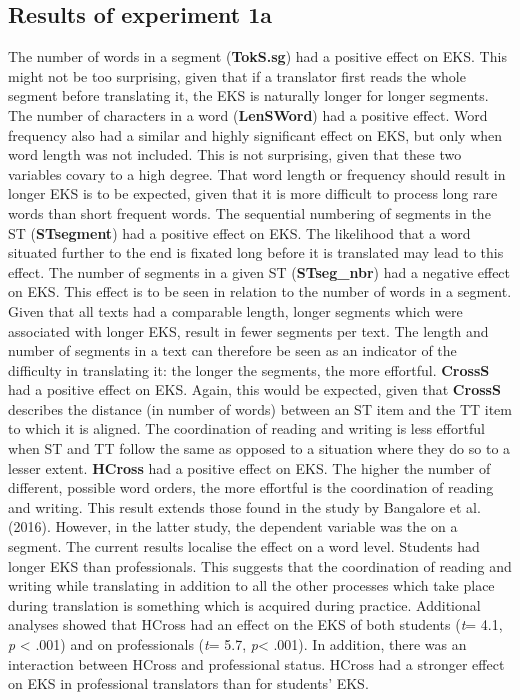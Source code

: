 \documentclass[output=paper]{LSP/langsci}
\begin{document}
\subsection{Results of experiment 1a}

The number of words in a segment (\textbf{TokS.sg}) had a positive effect on EKS. This might not be too surprising, given that if a translator first reads the whole segment before translating it, the EKS is naturally longer for longer segments. The number of characters in a word (\textbf{LenSWord}) had a positive effect. Word frequency also had a similar and highly significant effect on EKS, but only when word length was not included. This is not surprising, given that these two variables covary to a high degree. That word length or frequency should result in longer EKS is to be expected, given that it is more difficult to process long rare words than short frequent words. The sequential numbering of segments in the ST (\textbf{STsegment}) had a positive effect on EKS. The likelihood that a word situated further to the end is fixated long before it is translated may lead to this effect. The number of segments in a given ST (\textbf{STseg\_nbr}) had a negative effect on EKS. This effect is to be seen in relation to the number of words in a segment. Given that all texts had a comparable length, longer segments which were associated with longer EKS, result in fewer segments per text. The length and number of segments in a text can therefore be seen as an indicator of the difficulty in translating it: the longer the segments, the more effortful. \textbf{CrossS} had a positive effect on EKS. Again, this would be expected, given that \textbf{CrossS} describes the distance (in number of words) between an ST item and the TT item to which it is aligned. The coordination of reading and writing is less effortful when ST and TT follow the same  as opposed to a situation where they do so to a lesser extent. \textbf{HCross} had a positive effect on EKS. 
The higher the number of different, possible word orders, the more effortful is the coordination of reading and writing. This result extends those found in the study by Bangalore et al. (2016). However, in the latter study, the dependent variable was the  on a segment. The current results localise the effect on a word level. Students had longer EKS than professionals. This suggests that the coordination of reading and writing while translating in addition to all the other processes which take place during translation is something which is acquired during practice. Additional analyses showed that HCross had an effect on the EKS of both students (\textit{t}= 4.1, \textit{p} {\textless} .001) and on professionals (\textit{t}= 5.7, \textit{p}{\textless} .001). In addition, there was an interaction between HCross and professional status. HCross had a stronger effect on EKS in professional translators than for students' EKS.
\end{document}

